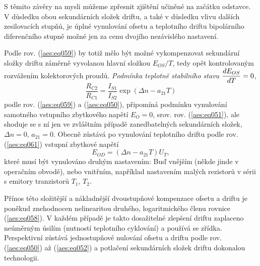         S těmito závěry na mysli můžeme zpřesnit zjištění učiněné na začátku odstavce. V důsledku
        obou sekundárních složek driftu, a také v důsledku vlivu dalších zesilovacích stupňů, je
        úplné vynulování ofsetu a teplotního driftu bipolárního diferenčního stupně možné jen za
        cenu dvojího nezávislého nastavení.

        Podle rov. (\ref{aes:eq059}) by totiž mělo být možné vykompenzovat sekundární složky driftu
        záměrně vyvolanou hlavní složkou \(E_{OS}/T\), tedy opět kontrolovaným rozvážením
        kolektorových proudů. \emph{Podmínka teplotně stabilního stavu} \(\dfrac{d E_{OS}}{d T}= 0\),
        \begin{equation}\label{aes:eq061}
          \dfrac{R_{C2}}{R_{C1}} = \dfrac{I_{S1}}{I_{S2}}\exp(\Delta n - a_{21}T)
        \end{equation} 
        podle rov. (\ref{aes:eq059})  a (\ref{aes:eq050}), připomíná podmínku vynulování samotného
        vstupního zbytkového napětí \(E_{O}= 0\), srov. rov. (\ref{aes:eq051}), ale shoduje se s ní
        jen ve zvláštním případě zanedbatelných sekundárních složek, \(\Delta n = 0\), \(a_{21} =
        0\). Obecně zůstává po vynulování teplotního driftu podle rov. (\ref{aes:eq061}) vstupní
        zbytkové napětí
        \begin{equation}\label{aes:eq062}
          E_{OD} = (\Delta n - a_{21}T)U_T,
        \end{equation}
        které musí být vynulováno druhým nastavením: Buď vnějším (někde jinde v operačním obvodě),
        nebo vnitřním, například nastavením malých rezistorů v sérii s emitory tranzistorů \(T_1\),
        \(T_2\). 

        Přínos této složitější a nákladnější dvoustupňové kompenzace ofsetu a driftu je poněkud
        znehodnocen nelinearitou druhého, logaritmického členu rovnice (\ref{aes:eq058}). V každém
        případě je takto dosažitelné zlepšení driftu zaplaceno neúměrným úsilím (nutností teplotního
        cyklování) a používá se zřídka. Perspektivní zůstává jednostupňové nulování ofsetu a driftu
        podle rov. (\ref{aes:eq050}) až (\ref{aes:eq052}) a potlačení sekundárních složek driftu
        dokonalou technologii.

